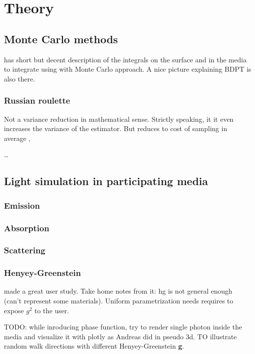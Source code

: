 \chapter{Theory}
\label{chapter:theory}


\section{Monte Carlo methods}
\cite{Lafortune:1996:RPM:275458.275468} has short but decent description of the
integrals on the surface and in the media to integrate using with Monte Carlo
approach.
A nice picture explaining BDPT is also there.

\subsection{Russian roulette}
\label{subsection:rr}
Not a variance reduction in mathematical sense. Strictly speaking, it it even
increases the variance of the estimator. But reduces to cost of sampling in
average \cite{Veach:1998:RMC:927297}, \cite{Csi03variancereduction}

\ldots

\section{Light simulation in participating media}
\subsection{Emission}
\subsection{Absorption}
\subsection{Scattering}

\subsection{Henyey-Greenstein}
\cite{Gkioulekas:2013:IVR:2508363.2508377} made a great user study.
Take home notes from it: \gls{hg} is not general enough (can't represent some
materials). Uniform parametrization needs requires to expose $g^2$ to the user.

TODO: while inroducing phase function, try to render single photon inside the
media and visualize it with plotly as Andreas did in pseudo 3d. TO illustrate
random walk directions with different Henyey-Greenstein \textbf{g}.

